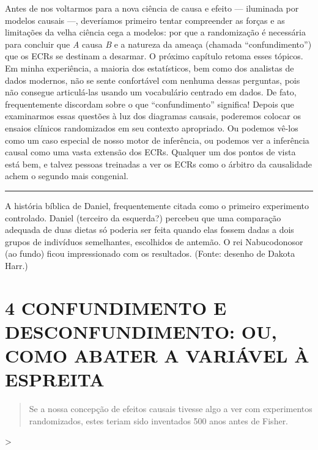 \documentclass[11pt,a5paper,twoside]{book}
\begin{document}
Antes de nos voltarmos para a nova ciência de causa e efeito — iluminada por modelos causais —, deveríamos primeiro tentar compreender as forças e as limitações da velha ciência cega a modelos: por que a randomização é necessária para concluir que \textit{A} causa \textit{B} e a natureza da ameaça (chamada “confundimento”) que os ECRs se destinam a desarmar. O próximo capítulo retoma esses tópicos. Em minha experiência, a maioria dos estatísticos, bem como dos analistas de dados modernos, não se sente confortável com nenhuma dessas perguntas, pois não consegue articulá-las usando um vocabulário centrado em dados. De fato, frequentemente discordam sobre o que “confundimento” significa! Depois que examinarmos essas questões à luz dos diagramas causais, poderemos colocar os ensaios clínicos randomizados em seu contexto apropriado. Ou podemos vê-los como um caso especial de nosso motor de inferência, ou podemos ver a inferência causal como uma vasta extensão dos ECRs. Qualquer um dos pontos de vista está bem, e talvez pessoas treinadas a ver os ECRs como o árbitro da causalidade achem o segundo mais congenial.

\vspace{1em}\hrule\vspace{1em}
A história bíblica de Daniel, frequentemente citada como o primeiro experimento controlado. Daniel (terceiro da esquerda?) percebeu que uma comparação adequada de duas dietas só poderia ser feita quando elas fossem dadas a dois grupos de indivíduos semelhantes, escolhidos de antemão. O rei Nabucodonosor (ao fundo) ficou impressionado com os resultados. (Fonte: desenho de Dakota Harr.)

\chapter{4 CONFUNDIMENTO E DESCONFUNDIMENTO: OU, COMO ABATER A VARIÁVEL À ESPREITA}
\begin{quote}
Se a nossa concepção de efeitos causais tivesse algo a ver com experimentos randomizados, estes teriam sido inventados 500 anos antes de Fisher.
\end{quote}
>
\end{document}
